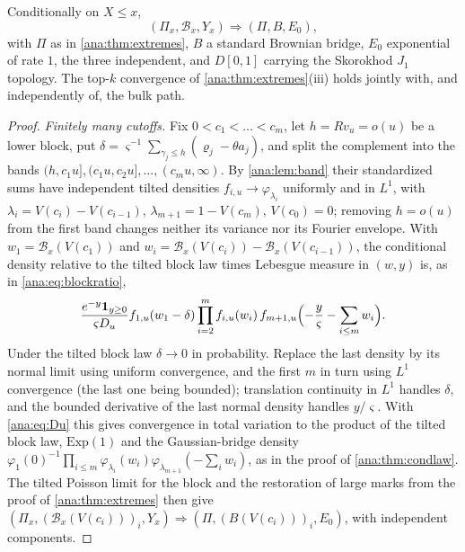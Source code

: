 \begin{theorem}\label{ana:thm:functional}
Conditionally on $X\le x$,
\[
 (\Pi_x,\mathcal B_x,Y_x)\Longrightarrow(\Pi,B,E_0),
\]
with $\Pi$ as in \cref{ana:thm:extremes}, $B$ a standard Brownian bridge, $E_0$ exponential of rate $1$,
the three independent, and $D[0,1]$ carrying the Skorokhod $J_1$ topology. The top-$k$ convergence of
\cref{ana:thm:extremes}(iii) holds jointly with, and independently of, the bulk path.
\end{theorem}

\begin{proof}
\emph{Finitely many cutoffs.} Fix $0<c_1<\dots<c_m$, let $h=Rv_u=o(u)$ be a lower block, put
$\delta=\varsigma^{-1}\sum_{\gamma_j\le h}(\varrho_j-\theta a_j)$, and split the complement into the bands
$(h,c_1u],(c_1u,c_2u],\dots,(c_mu,\infty)$. By \cref{ana:lem:band} their standardized sums have independent
tilted densities $f_{i,u}\to\varphi_{\lambda_i}$ uniformly and in $L^1$, with $\lambda_i=V(c_i)-V(c_{i-1})$,
$\lambda_{m+1}=1-V(c_m)$, $V(c_0)=0$; removing $h=o(u)$ from the first band changes neither its variance
nor its Fourier envelope. With $w_1=\mathcal B_x(V(c_1))$ and $w_i=\mathcal B_x(V(c_i))-\mathcal B_x(V(c_{i-1}))$,
the conditional density relative to the tilted block law times Lebesgue measure in $(w,y)$ is, as in
\eqref{ana:eq:blockratio},
\[
 \frac{e^{-y}\mathbf{1}_{y\ge0}}{\varsigma D_u}f_{1,u}(w_1-\delta)\prod_{i=2}^mf_{i,u}(w_i)\,
 f_{m+1,u}\Bigl(-\frac y\varsigma-\sum_{i\le m}w_i\Bigr).
\]
Under the tilted block law $\delta\to0$ in probability. Replace the last density by its normal limit
using uniform convergence, and the first $m$ in turn using $L^1$ convergence (the last one being bounded);
translation continuity in $L^1$ handles $\delta$, and the bounded derivative of the last normal density
handles $y/\varsigma$. With \eqref{ana:eq:Du} this gives convergence in total variation to the product of
the tilted block law, $\mathrm{Exp}(1)$ and the Gaussian-bridge density
$\varphi_1(0)^{-1}\prod_{i\le m}\varphi_{\lambda_i}(w_i)\varphi_{\lambda_{m+1}}(-\sum_iw_i)$, as in the proof of
\cref{ana:thm:condlaw}. The tilted Poisson limit for the block and the restoration of large marks from the
proof of \cref{ana:thm:extremes} then give
$(\Pi_x,(\mathcal B_x(V(c_i)))_i,Y_x)\Rightarrow(\Pi,(B(V(c_i)))_i,E_0)$, with independent components.


\end{proof}
